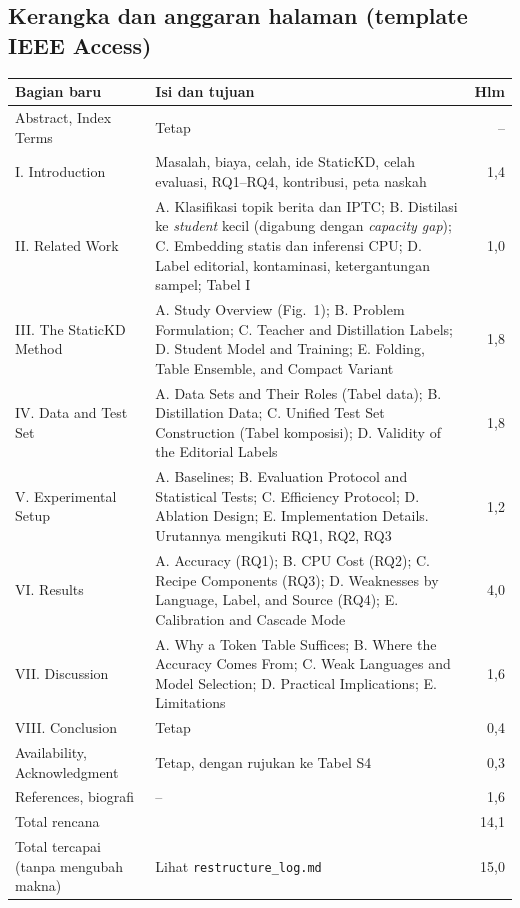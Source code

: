 \documentclass[10pt,a4paper]{article}
\begin{document}
\subsection{Kerangka dan anggaran halaman (template IEEE Access)}
\begin{longtable}{@{}p{}p{}r@{}}
\toprule
Bagian baru & Isi dan tujuan & Hlm\\
\midrule
\endhead
Abstract, Index Terms & Tetap & --\\
I. Introduction & Masalah, biaya, celah, ide StaticKD, celah evaluasi, RQ1--RQ4, kontribusi, peta naskah & 1,4\\
II. Related Work & A. Klasifikasi topik berita dan IPTC; B. Distilasi ke \emph{student} kecil (digabung dengan \emph{capacity gap}); C. Embedding statis dan inferensi CPU; D. Label editorial, kontaminasi, ketergantungan sampel; Tabel I & 1,0\\
III. The StaticKD Method & A. Study Overview (Fig.~1); B. Problem Formulation; C. Teacher and Distillation Labels; D. Student Model and Training; E. Folding, Table Ensemble, and Compact Variant & 1,8\\
IV. Data and Test Set & A. Data Sets and Their Roles (Tabel data); B. Distillation Data; C. Unified Test Set Construction (Tabel komposisi); D. Validity of the Editorial Labels & 1,8\\
V. Experimental Setup & A. Baselines; B. Evaluation Protocol and Statistical Tests; C. Efficiency Protocol; D. Ablation Design; E. Implementation Details. Urutannya mengikuti RQ1, RQ2, RQ3 & 1,2\\
VI. Results & A. Accuracy (RQ1); B. CPU Cost (RQ2); C. Recipe Components (RQ3); D. Weaknesses by Language, Label, and Source (RQ4); E. Calibration and Cascade Mode & 4,0\\
VII. Discussion & A. Why a Token Table Suffices; B. Where the Accuracy Comes From; C. Weak Languages and Model Selection; D. Practical Implications; E. Limitations & 1,6\\
VIII. Conclusion & Tetap & 0,4\\
Availability, Acknowledgment & Tetap, dengan rujukan ke Tabel S4 & 0,3\\
References, biografi & -- & 1,6\\
\midrule
Total rencana & & 14,1\\
Total tercapai (tanpa mengubah makna) & Lihat \texttt{restructure\_log.md} & 15,0\\
\bottomrule
\end{longtable}
\end{document}
